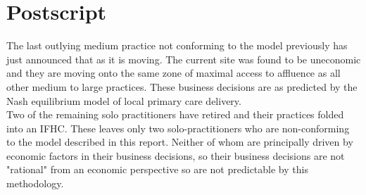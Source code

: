 \documentclass[11pt,a4paper]{article}
\begin{document}
\section{Postscript}
The last outlying medium practice not conforming to the model previously has just announced that as it is moving. The current site was found to be uneconomic and they are moving onto the same zone of maximal access to affluence as all other medium to large practices. These business decisions are as predicted by the Nash equilibrium model of local primary care delivery. \\

Two of the remaining solo practitioners have retired and their practices folded into an IFHC. These leaves only two solo-practitioners who are non-conforming to the model described in this report. Neither of whom are principally driven by economic factors in their business decisions, so their business decisions are not "rational" from an economic perspective so are not predictable by this methodology.\\ 

\pagebreak


\end{document}
